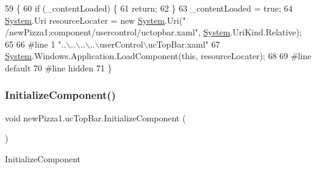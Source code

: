 \begin{DoxyCode}
59                                           \{
60             \textcolor{keywordflow}{if} (\_contentLoaded) \{
61                 \textcolor{keywordflow}{return};
62             \}
63             \_contentLoaded = \textcolor{keyword}{true};
64             \hyperlink{namespaceSystem}{System}.Uri resourceLocater = \textcolor{keyword}{new} \hyperlink{namespaceSystem}{System}.Uri(\textcolor{stringliteral}{"
      /newPizza1;component/usercontrol/uctopbar.xaml"}, \hyperlink{namespaceSystem}{System}.UriKind.Relative);
65             
66 \textcolor{preprocessor}{            #line 1 "..\(\backslash\)..\(\backslash\)..\(\backslash\)..\(\backslash\)userControl\(\backslash\)ucTopBar.xaml"
}
67             \hyperlink{namespaceSystem}{System}.Windows.Application.LoadComponent(\textcolor{keyword}{this}, resourceLocater);
68             
69 \textcolor{preprocessor}{            #line default
}
70 \textcolor{preprocessor}{            #line hidden
}
71         \}
\end{DoxyCode}
\mbox{\label{classnewPizza1_1_1ucTopBar_a667aed93b177538819f27c62e5e88844}} 
\subsubsection{\texorpdfstring{Initialize\+Component()}{InitializeComponent()}\hspace{0.1cm}{\footnotesize\ttfamily [6/6]}}
{\footnotesize\ttfamily void new\+Pizza1.\+uc\+Top\+Bar.\+Initialize\+Component (\begin{DoxyParamCaption}{ }\end{DoxyParamCaption})\hspace{0.3cm}{\ttfamily [inline]}}



Initialize\+Component 


